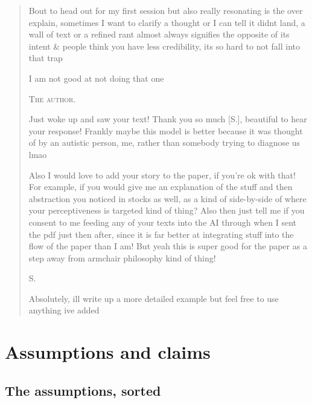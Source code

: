 \begin{quote}
\par\smallskip\noindent Bout to head out for my first session but also really resonating is the over explain, sometimes I want to clarify a thought or I can tell it didnt land, a wall of text or a refined rant almost always signifies the opposite of its intent \& people think you have less credibility, its so hard to not fall into that trap
\par\smallskip\noindent I am not good at not doing that one
\par\medskip\noindent\textsc{The author.}
\par\smallskip\noindent Just woke up and saw your text! Thank you so much [S.], beautiful to hear your response! Frankly maybe this model is better because it was thought of by an autistic person, me, rather than somebody trying to diagnose us lmao
\par\smallskip\noindent Also I would love to add your story to the paper, if you’re ok with that! For example, if you would give me an explanation of the stuff and then abstraction you noticed in stocks as well, as a kind of side-by-side of where your perceptiveness is targeted kind of thing? Also then just tell me if you consent to me feeding any of your texts into the AI through when I sent the pdf just then after, since it is far better at integrating stuff into the flow of the paper than I am! But yeah this is super good for the paper as a step away from armchair philosophy kind of thing!
\par\medskip\noindent\textsc{S.}
\par\smallskip\noindent Absolutely, ill write up a more detailed example but feel free to use anything ive added
\end{quote}

\section{Assumptions and claims}\label{app:assumptions}

\subsection{The assumptions, sorted}

